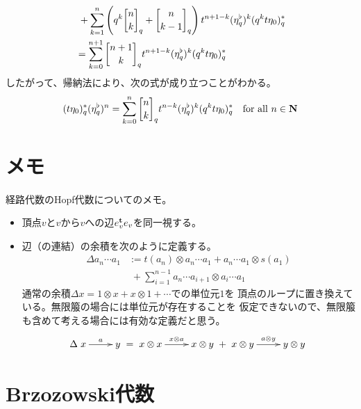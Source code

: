 {\begin{equation*}
\begin{split}
		&\; + \sum_{k=1}^n\plr{q^k\qbinom{n}{k}_q + \qbinom{n}{k-1}_q}
			t^{n+1-k}(\eta_q^\flat)^k(q^kt\eta_0)_q^* \\
		&= \sum_{k=0}^{n+1} \qbinom{n+1}{k}_qt^{n+1-k}
			(\eta_q^\flat)^k(q^kt\eta_0)_q^*
	\end{split}\end{equation*}
	したがって、帰納法により、次の式が成り立つことがわかる。
	\begin{equation*}\begin{split}
		(t\eta_0)_q^*(\eta_q^\flat)^n
		= \sum_{k=0}^n \qbinom{n}{k}_qt^{n-k}(\eta_q^\flat)^k(q^kt\eta_0)_q^*
		\quad\text{for all } n\in\sizen
	\end{split}\end{equation*}
\section{メモ}\label{s1:メモ} %
	経路代数のHopf代数\cite{Cibils:2000}についてのメモ。
	\begin{itemize}\setlength{\itemsep}{-1mm} %
		\item 頂点$v$と$v$から$v$への辺$e_v^{\mathbf{t}} e_v$を同一視する。
		\item 辺（の連結）の余積を次のように定義する。
		\begin{equation*}\begin{split}
			\Delta a_n\cdots a_1 &:= t(a_n)\otimes a_n\cdots a_1
			+ a_n\cdots a_1\otimes s(a_1) \\
			&\; + \sum_{i=1}^{n-1} a_n\cdots a_{i+1}\otimes a_i\cdots a_1
		\end{split}\end{equation*}
		通常の余積$\Delta x=1\otimes x+x\otimes 1 +\cdots$での単位元$1$を
		頂点のループに置き換えている。無限箙の場合には単位元が存在することを
		仮定できないので、無限箙も含めて考える場合には有効な定義だと思う。
		\begin{equation*}\begin{split}
			\Delta\xymatrix{
				x \ar[r]^a & y
			} = \xymatrix{
				x\otimes x \ar[r]^{x\otimes a} & x\otimes y
			} + \xymatrix{
				x\otimes y \ar[r]^{a\otimes y} & y\otimes y
			}
		\end{split}\end{equation*}
	\end{itemize} %
\section{Brzozowski代数}\label{s1:Brzozowski代数} %
}
